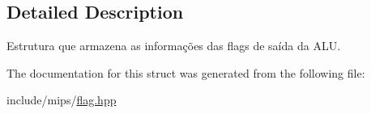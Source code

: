 \subsection{Detailed Description}
Estrutura que armazena as informações das flags de saída da A\+LU. 

The documentation for this struct was generated from the following file\+:\begin{DoxyCompactItemize}
\item 
include/mips/\hyperlink{flag_8hpp}{flag.\+hpp}\end{DoxyCompactItemize}
